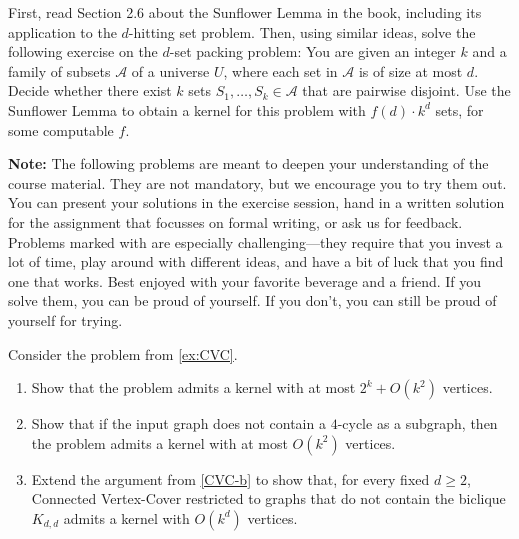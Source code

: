 \documentclass[english]{uebung_cs}
\begin{document}
\begin{exercise}
  First, read Section 2.6 about the Sunflower Lemma in the book, including its application to the $d$-hitting set problem.
  Then, using similar ideas, solve the following exercise on the $d$-set packing problem:
  You are given an integer $k$ and a family of subsets $\mathcal{A}$ of a universe $U$, where each set in $\mathcal{A}$ is of size at most $d$. Decide whether there exist $k$ sets $S_1,\ldots,S_k \in \mathcal{A}$ that are pairwise disjoint.
  Use the Sunflower Lemma to obtain a kernel for this problem with $f(d)\cdot k^d$ sets, for some computable $f$.
\end{exercise}

\sepline

\textbf{Note:} The following problems are meant to deepen your understanding of the course material. They are not mandatory, but we encourage you to try them out. You can present your solutions in the exercise session, hand in a written solution for the assignment that focusses on formal writing, or ask us for feedback.
Problems marked with \hard are especially challenging---they require that you invest a lot of time, play around with different ideas, and have a bit of luck that you find one that works. Best enjoyed with your favorite beverage and a friend. If you solve them, you can be proud of yourself. If you don't, you can still be proud of yourself for trying.

\begin{exercise}
  Consider the problem from \ref{ex:CVC}.
  \begin{enumerate}
    \item Show that the problem admits a kernel with at most $2^k + O(k^2)$ vertices.
    \item\label{CVC-b} Show that if the input graph does not contain a $4$-cycle as a subgraph, then the problem admits a
          kernel with at most $O(k^2)$ vertices.
    \item Extend the argument from \ref{CVC-b} to show that, for every fixed $d \geq 2$, Connected Vertex-Cover restricted to graphs that do not contain the biclique $K_{d,d}$ admits a kernel with $O(k^d)$ vertices.
  \end{enumerate}
\end{exercise}
\end{document}
